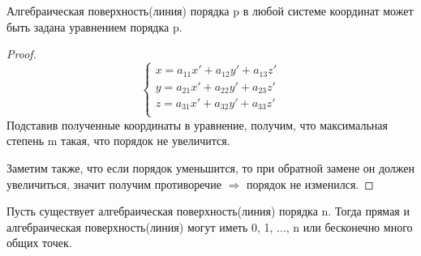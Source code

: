 \begin{theorem}
    Алгебраическая поверхность(линия) порядка p в любой системе координат может быть задана уравнением порядка p.
\end{theorem}
\begin{proof}
    \[
    \begin{cases}
        x = a_{11}x' + a_{12}y' + a_{13}z'\\
        y = a_{21}x' + a_{22}y' + a_{23}z'\\
        z = a_{31}x' + a_{32}y' + a_{33}z'\\
    \end{cases}
    \]
    Подставив полученные координаты в уравнение, получим, что максимальная степень m такая, что порядок не увеличится.

    Заметим также, что если порядок уменьшится, то при обратной замене он должен увеличиться, значит получим противоречие $\Longrightarrow$ порядок не изменился.
\end{proof}

\begin{lemma}
    Пусть существует алгебраическая поверхность(линия) порядка n. Тогда прямая и алгебраическая поверхность(линия) могут иметь 0, 1, ..., n или бесконечно много общих точек.
\end{lemma}

